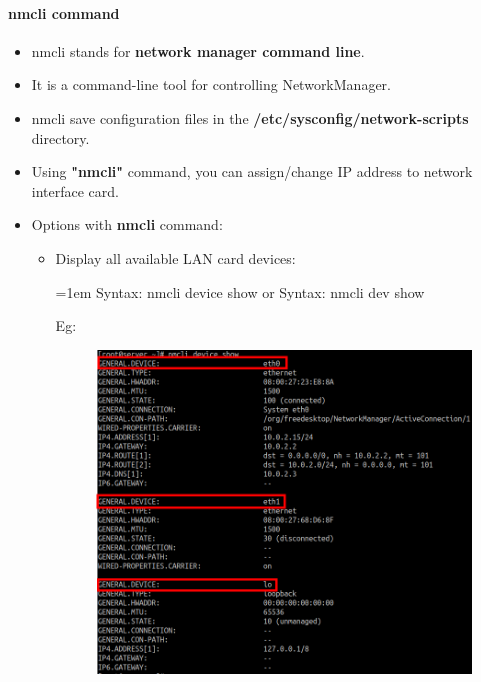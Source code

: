 \setlength{\columnsep}{3pt}
\begin{flushleft}
\bigskip

\paragraph{nmcli command}

\begin{itemize}
	\item nmcli stands for \textbf{network manager command line}.
	\item It is a command-line tool for controlling NetworkManager.
	\item nmcli save configuration files in the \textbf{/etc/sysconfig/network-scripts} directory.
	\item Using \textbf{"nmcli"} command, you can assign/change IP address to network interface card.
	\item Options with \textbf{nmcli} command:
	\begin{itemize}
		\item Display all available LAN card devices:
		\begin{tcolorbox}[breakable,notitle,boxrule=-0pt,colback=pink,colframe=pink]
			\color{black}
			\font=1em
			Syntax: nmcli device show
			\newline
			or
			\newline
			Syntax: nmcli dev show
			\font=4pt
		\end{tcolorbox}
		Eg:
		\begin{figure}[h!]
			\centering
			\includegraphics[scale=.35]{content/chapter14/images/cards.png}

\end{figure}
\end{itemize}
\end{itemize}
\end{flushleft}
